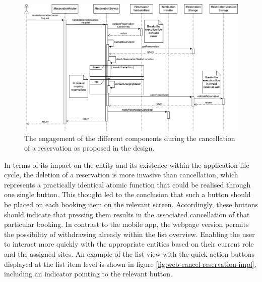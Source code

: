 \newpage

\begin{figure}[h]
    \centering
    \includegraphics[scale=0.4]{resources/images/main/6_implementation/processes/ReservationCancel.png}
    \caption{The engagement of the different components during the cancellation of a reservation as proposed in the design.}
    \label{fig:cancel-reservation-seqflow}
\end{figure}

\noindent In terms of its impact on the entity and its existence within the application life cycle, the deletion of a reservation is more invasive than cancellation, which represents a practically identical atomic function that could be realised through one single button. 
This thought led to the conclusion that such a button should be placed on each booking item on the relevant screen. Accordingly, these buttons should indicate that pressing them results in the associated cancellation of that particular booking.
In contrast to the mobile app, the webpage version permits the possibility of withdrawing already within the list overview. Enabling the user to interact more quickly with the appropriate entities based on their current role and the assigned sites.
An example of the list view with the quick action buttons displayed at the list item level is shown in figure \ref{fig:web-cancel-reservation-impl}, including an indicator pointing to the relevant button.

